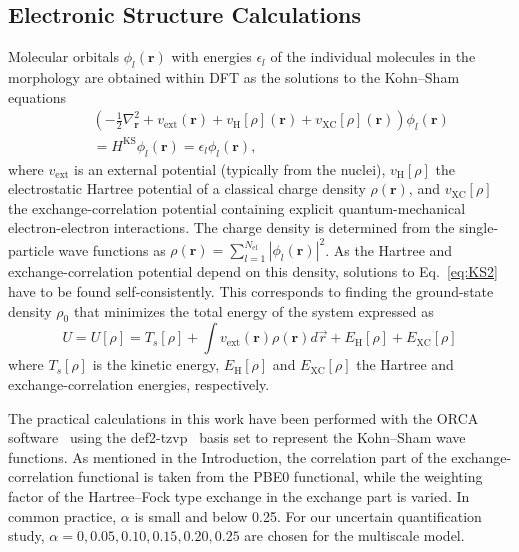 \documentclass[%
 reprint,
superscriptaddress,
 amsmath,amssymb,
 aps,
prb,
floatfix
]{revtex4-2}
\newcommand{\change}[1]{{\color{blue}{#1}}}
\begin{document}
\subsection{Electronic Structure Calculations} 
\label{sec:es}
Molecular orbitals $\phi_l (\mathbf{r})$ with energies $\epsilon_l$ of the individual molecules in the morphology are obtained within DFT as the solutions to the  Kohn--Sham equations~\cite{kohn_self_1965}
%
\begin{eqnarray}
    && \left(-\frac{1}{2}\nabla^2_{\mathbf{r}} + v_\text{ext}(\mathbf{r}) + v_\text{H}[\rho](\mathbf{r}) + v_\text{XC}[\rho](\mathbf{r})\right) \phi_l(\mathbf{r}) \nonumber \\
    && = H^\text{KS} \phi_l(\mathbf{r}) = \epsilon_l \phi_l (\mathbf{r}) ,
    \label{eq:KS2}
\end{eqnarray}
%
where $v_\text{ext}$ is an external potential (typically from the nuclei), $v_\text{H}[\rho]$ the electrostatic Hartree potential of a classical charge density $\rho(\mathbf{r})$, and $v_\text{XC}[\rho]$ the exchange-correlation potential containing explicit quantum-mechanical electron-electron interactions. The charge density is determined from the single-particle wave functions as $\rho(\mathbf{r})=\sum\limits_{l=1}^{N_\text{el}} \left\vert\phi_l(\mathbf{r})\right\vert^2$. As the Hartree and exchange-correlation potential depend on this density, solutions to Eq.~\ref{eq:KS2} have to be found self-consistently. This corresponds to finding the ground-state density $\rho_0$ that minimizes the total energy of the system expressed as
%
\begin{equation}
    U=U[\rho] = T_s[\rho] + \int v_\text{ext}(\mathbf{r}) \rho(\mathbf{r}) d \vec{r} + E_\text{H}[\rho] + E_\text{XC}[\rho]
    \label{eq:KS_model}
\end{equation}
%
where $T_s[\rho]$ is the kinetic energy, $E_\text{H}[\rho]$ and $E_\text{XC}[\rho]$ the Hartree and exchange-correlation energies, respectively. 

The practical calculations in this work have been performed with the ORCA software~\cite{Neese2012a} using the def2-tzvp~\cite{weigend_accurate_2006} basis set to represent the Kohn--Sham wave functions. As mentioned in the Introduction, the correlation part of the exchange-correlation functional is taken from the PBE0 functional, while the weighting factor of the Hartree--Fock type exchange in the exchange part is varied. In common practice, $\alpha$ is small and below 0.25. For our uncertain quantification study, $\alpha=0,0.05,0.10,0.15,0.20,0.25$ are chosen for the multiscale model. \change{DFT calculations are performed in vacuum for the parametrization of microelectrostatic models and the calculations of reorganization energies and coupling elements below.}
\end{document}
